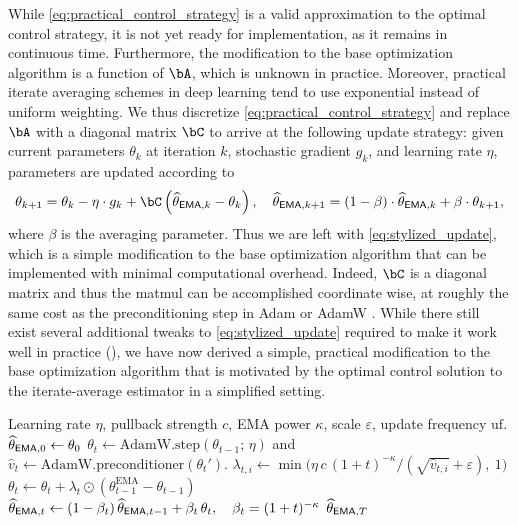 While \eqref{eq:practical_control_strategy} is a valid approximation to the optimal control strategy, it is not yet ready for implementation, as it remains in continuous time.  Furthermore, the modification to the base optimization algorithm is a function of $\bA$, which is unknown in practice.  Moreover, practical iterate averaging schemes in deep learning tend to use exponential instead of uniform weighting.  We thus discretize \eqref{eq:practical_control_strategy} and replace $\bA$ with a diagonal matrix $\bC$ to arrive at the following update strategy: given current parameters $\theta_k$ at iteration $k$, stochastic gradient $g_k$, and learning rate $\eta$, parameters are updated according to
\begin{align}\label{eq:stylized_update}
    \theta_{k+1} = \theta_k - \eta \cdot g_k +  \bC \left( \thetema[k] - \theta_k \right), \quad \thetema[k+1] = (1 - \beta) \cdot \thetema[k] + \beta \cdot \theta_{k+1},
\end{align}
where $\beta$ is the averaging parameter. Thus we are left with \eqref{eq:stylized_update}, which is a simple modification to the base optimization algorithm that can be implemented with minimal computational overhead. Indeed, $\bC$ is a diagonal matrix and thus the matmul can be accomplished coordinate wise, at roughly the same cost as the preconditioning step in Adam or AdamW \citep{loshchilov2017fixing,kingma2014adam}.   While there still exist several additional tweaks to \eqref{eq:stylized_update} required to make it work well in practice (), we have now derived a simple, practical modification to the base optimization algorithm that is motivated by the optimal control solution to the iterate-average estimator in a simplified setting.



\begin{algorithm}[t]
\caption{\textbf{\pace}: \textbf Pullback \textbf Averaging \textbf Control for \textbf Efficient Optimization}
\label{alg:controlled-bema}
\begin{algorithmic}[1]
\Require Learning rate $\eta$, pullback strength $c$, EMA power $\kappa$, scale $\varepsilon$, update frequency $\mathrm{uf}$.
\State $\thetema[0] \gets \theta_0$
    \State $\theta_t \gets \mathrm{AdamW.step}(\theta_{t-1};\, \eta)$ and $\hat v_t \gets \mathrm{AdamW.preconditioner}(\theta_t')$.
    \State $\lambda_{t,i} \gets \min\!\bigl(\eta\, c\, (1+t)^{-\kappa} / (\sqrt{\hat v_{t,i}} + \varepsilon),\ 1\bigr)$ 
    \State $\theta_t \gets \theta_t + \lambda_t \odot (\theta_{t-1}^{\mathrm{EMA}} - \theta_{t-1})$ 
    \State $\thetema \gets (1 - \beta_t)\, \thetema[t-1] + \beta_t\, \theta_t,\quad \beta_t = (1+t)^{-\kappa}$ 
    \EndIf
\EndFor
\State \Return $\thetema[T]$
\end{algorithmic}
\end{algorithm}

